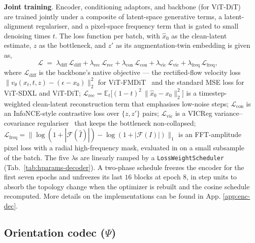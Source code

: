 \documentclass{article}
\begin{document}
\textbf{Joint training}. Encoder, conditioning adaptors, and backbone (for ViT-DiT) are trained jointly under a composite of latent-space generative terms, a latent-alignment regulariser, and a pixel-space frequency term that is gated to small denoising times $t$. The loss function per batch, with $\hat x_0$ as the clean-latent estimate, $z$ as the bottleneck, and $z'$ as its augmentation-twin embedding is given as,
\begin{equation}
  \mathcal{L} \;=\; \lambda_{\mathrm{diff}}\,\mathcal{L}_{\mathrm{diff}}
              + \lambda_{\mathrm{rec}}\,\mathcal{L}_{\mathrm{rec}}
              + \lambda_{\mathrm{con}}\,\mathcal{L}_{\mathrm{con}}
              + \lambda_{\mathrm{vic}}\,\mathcal{L}_{\mathrm{vic}}
              + \lambda_{\mathrm{freq}}\,\mathcal{L}_{\mathrm{freq}},
  \label{eq:composite-loss}
\end{equation}
where $\mathcal{L}_{\mathrm{diff}}$ is the backbone's native objective --- the rectified-flow velocity loss $\lVert v_\theta(x_t,t,z) - (\epsilon - x_0)\rVert_2^2$ for ViT-FMDiT~\citep{lipman2023flowmatching} and the standard MSE loss for ViT-SDXL and ViT-DiT; $\mathcal{L}_{\mathrm{rec}} = \mathbb{E}_t\bigl[(1{-}t)^2\,\lVert\hat x_0 - x_0\rVert_2^2\bigr]$ is a timestep-weighted clean-latent reconstruction term that emphasises low-noise steps; $\mathcal{L}_{\mathrm{con}}$ is an InfoNCE-style contrastive loss over $\{z, z'\}$ pairs; $\mathcal{L}_{\mathrm{vic}}$ is a VICReg variance--covariance regulariser~\citep{bardes2022vicreg} that keeps the bottleneck non-collapsed; $\mathcal{L}_{\mathrm{freq}} = \lVert \log(1{+}|\mathcal{F}(\hat I)|) - \log(1{+}|\mathcal{F}(I)|)\rVert_1$ is an FFT-amplitude pixel loss with a radial high-frequency mask, evaluated in on a small subsample of the batch. The five $\lambda$s are linearly ramped by a \texttt{LossWeightScheduler} (Tab.~\ref{tab:hparams-decoder}). A two-phase schedule freezes the encoder for the first seven epochs and unfreezes its last $16$ blocks at epoch $8$, in step units to absorb the topology change when the optimizer is rebuilt and the cosine schedule recomputed. More details on the implementations can be found in App. \ref{app:enc-dec}.


\subsection{Orientation codec ($\Psi$)}
\label{sec:codec}
\end{document}
